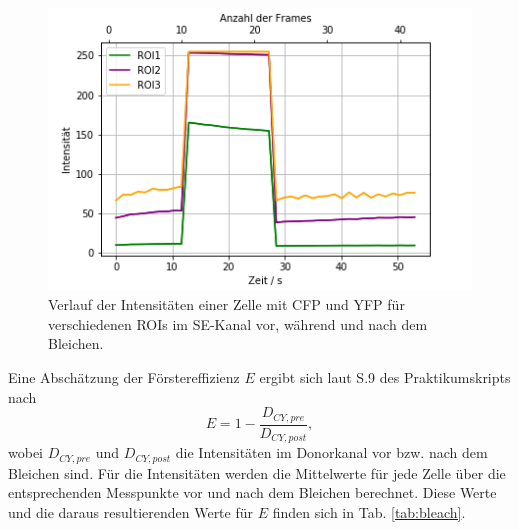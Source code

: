 \begin{figure}[h]
    \centering
    \includegraphics[scale = 0.65]{Bilder/bleachPlotS.png}
    \caption{Verlauf der Intensitäten einer Zelle mit CFP und YFP für verschiedenen ROIs im SE-Kanal vor, während und nach dem Bleichen.}
    \label{bild:bleachPlotS}
\end{figure}

Eine Abschätzung der Förstereffizienz $E$ ergibt sich laut S.9 des Praktikumskripts nach 
\begin{equation*}
    E = 1 - \frac{D_{CY,pre}}{D_{CY,post}},
\end{equation*}
wobei $D_{CY,pre}$ und $D_{CY,post}$ die Intensitäten im Donorkanal vor bzw. nach dem Bleichen sind. Für die Intensitäten werden die Mittelwerte 
für jede Zelle über die entsprechenden Messpunkte vor und nach dem Bleichen berechnet. Diese Werte und die daraus resultierenden Werte 
für $E$ finden sich in Tab. \ref{tab:bleach}.

